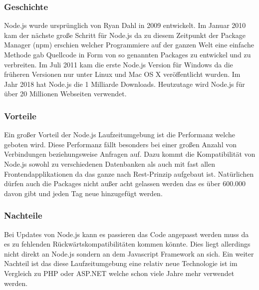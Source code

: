 		 	\subsubsection{Geschichte}
		 		Node.js wurde ursprünglich von Ryan Dahl in 2009 entwickelt. Im Januar 2010 kam der nächste große Schritt für Node.js da zu diesem Zeitpunkt der Package Manager (npm) erschien welcher Programmiere auf der ganzen Welt eine einfache Methode gab Quellcode in Form von so genannten Packages zu entwickel und zu verbreiten. Im Juli 2011 kam die erste Node.js Version für Windows da die früheren Versionen nur unter Linux und Mac OS X veröffentlicht wurden. Im Jahr 2018 hat Node.js die 1 Milliarde Downloads. Heutzutage wird Node.js für über 20 Millionen Webseiten verwendet. 
		 		
		 	\subsubsection{Vorteile}
		 		Ein großer Vorteil der Node.js Laufzeitumgebung ist die Performanz welche geboten wird. Diese Performanz fällt besonders bei einer großen Anzahl von Verbindungen beziehungsweise Anfragen auf. Dazu kommt die Kompatibilität von Node.js sowohl zu verschiedenen Datenbanken als auch mit fast allen Frontendapplikationen da das ganze nach Rest-Prinzip aufgebaut ist. Natürlichen dürfen auch die Packages nicht außer acht gelassen werden das es über 600.000 davon gibt und jeden Tag neue hinzugefügt werden.
		 		
		 	\subsubsection{Nachteile}
		 		Bei Updates von Node.js kann es passieren das Code angepasst werden muss da es zu fehlenden Rückwärtskompatibilitäten kommen könnte. Dies liegt allerdings nicht direkt an Node.js sondern an dem Javascript Framework an sich. Ein weiter Nachteil ist das diese Laufzeitumgebung eine relativ neue Technologie ist im Vergleich zu PHP oder ASP.NET welche schon viele Jahre mehr verwendet werden. 
		 		
